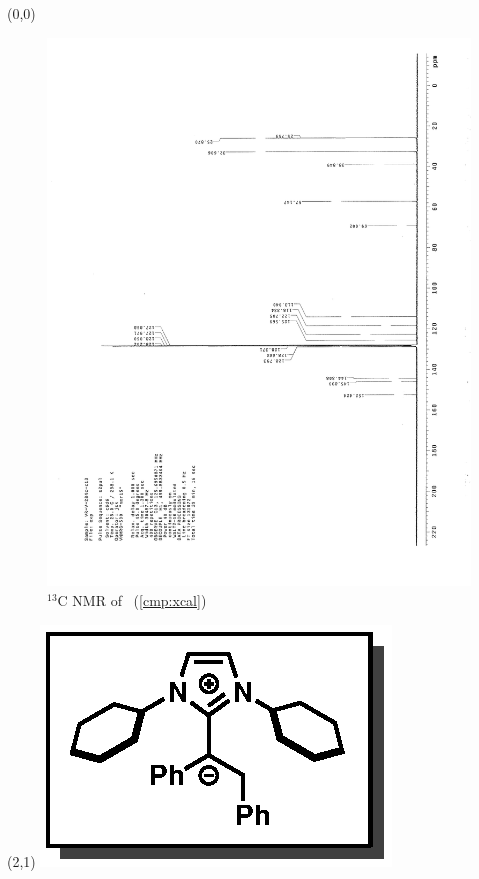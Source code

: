 \clearpage
\begin{textblock}{20}(0,0)
\begin{figure}[htb]
\caption{$^{13}$C NMR of  \CMPxcal\ (\ref{cmp:xcal})}
\includegraphics[scale=0.75, trim = 0mm 0mm 0mm 5mm,
clip]{chp_alkylation/images/nmr/xcalC}
\vspace{-100pt}
\end{figure}
\end{textblock}
\begin{textblock}{1}(2,1)
\includegraphics[scale=0.8, angle=90]{chp_alkylation/images/xcal}
\end{textblock}
